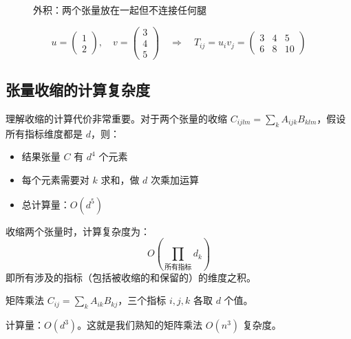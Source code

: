 \documentclass[12pt,a4paper]{ctexart}
\begin{document}
\begin{figure}[H]
\centering
{}
\caption{外积：两个张量放在一起但不连接任何腿}
\end{figure}

\begin{examplebox}[例7：外积]
\[
u = \begin{pmatrix} 1 \\ 2 \end{pmatrix}, \quad v = \begin{pmatrix} 3 \\ 4 \\ 5 \end{pmatrix}
\quad \Rightarrow \quad
T_{ij} = u_i v_j = \begin{pmatrix} 3 & 4 & 5 \\ 6 & 8 & 10 \end{pmatrix}
\]
\end{examplebox}

\subsection{张量收缩的计算复杂度}

理解收缩的计算代价非常重要。对于两个张量的收缩 $C_{ijlm} = \sum_k A_{ijk} B_{klm}$，假设所有指标维度都是 $d$，则：
\begin{itemize}
    \item 结果张量 $C$ 有 $d^4$ 个元素
    \item 每个元素需要对 $k$ 求和，做 $d$ 次乘加运算
    \item 总计算量：$O(d^5)$
\end{itemize}

\begin{keybox}[收缩的一般复杂度]
收缩两个张量时，计算复杂度为：
\[
    O\left(\prod_{\text{所有指标}} d_k\right)
\]
即所有涉及的指标（包括被收缩的和保留的）的维度之积。
\end{keybox}

\begin{examplebox}[例8：矩阵乘法的复杂度]
矩阵乘法 $C_{ij} = \sum_k A_{ik} B_{kj}$，三个指标 $i,j,k$ 各取 $d$ 个值。

计算量：$O(d^3)$。这就是我们熟知的矩阵乘法 $O(n^3)$ 复杂度。
\end{examplebox}
\end{document}

